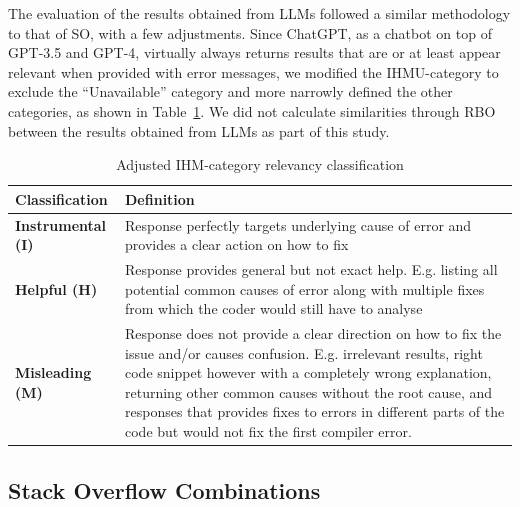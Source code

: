 \documentclass[preprint,12pt]{elsarticle}
\begin{document}
The evaluation of the results obtained from LLMs followed a similar methodology to that of SO, with a few adjustments. Since ChatGPT, as a chatbot on top of GPT-3.5 and GPT-4, virtually always returns results that are or at least appear relevant when provided with error messages, we modified the IHMU-category to exclude the ``Unavailable'' category and more narrowly defined the other categories, as shown in Table~\ref{table: gpt ih table}. We did not calculate similarities through RBO between the results obtained from LLMs as part of this study.

\renewcommand{\arraystretch}{1.3}
\begin{table}[ht]
    \centering
    \caption{Adjusted IHM-category relevancy classification}
    \label{table: gpt ih table}
    \footnotesize
\begin{tabular}{m{3.6cm}m{9.2cm}}
\bottomrule
    \hline
\rowcolor{gray!20} 
\textbf{Classification} & \textbf{Definition}  \\
\hline
\textbf{Instrumental (I)}   & Response perfectly targets underlying cause of error and provides a clear action on how to fix \\
 \hline
 \textbf{Helpful (H)} & Response provides general but not exact help. E.g. listing all potential common causes of error along with multiple fixes from which the coder would still have to analyse \\
 \hline
\textbf{Misleading (M)} &  Response does not provide a clear direction on how to fix the issue and/or causes confusion. E.g. irrelevant results, right code snippet however with a completely wrong explanation, returning other common causes without the root cause, and responses that provides fixes to errors in different parts of the code but would not fix the first compiler error. \\
 \bottomrule
  \hline
\end{tabular}
    
\end{table}

\subsection{Stack Overflow Combinations}
\end{document}
